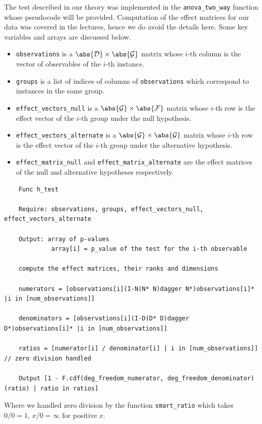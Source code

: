 \documentclass{article}
\begin{document}
The test described in our theory was implemented in the \texttt{anova\_two\_way} function whose pseudocode will be provided. Computation of the effect matrices for our data was covered in the lectures, hence we do avoid the details here. Some key variables and arrays are discussed below.
\begin{itemize}
    \item \texttt{observations} is a $\abs{\mathcal{D}} \times \abs{\mathcal{G}}$ matrix whose $i$-th column is the vector of observables of the $i$-th instance.
    \item \texttt{groups} is a list of indices of columns of \texttt{observations} which correspond to instances in the same group.
    \item \texttt{effect\_vectors\_null} is a $\abs{\mathcal{G}} \times \abs{\mathcal{F}}$ matrix whose $i$-th row is the effect vector of the $i$-th group under the null hypothesis.
    \item \texttt{effect\_vectors\_alternate} is a $\abs{\mathcal{G}} \times \abs{\mathcal{G}}$ matrix whose $i$-th row is the effect vector of the $i$-th group under the alternative hypothesis.
    \item \texttt{effect\_matrix\_null} and \texttt{effect\_matrix\_alternate} are the effect matrices of the null and alternative hypotheses respectively.
\end{itemize}

\begin{verbatim}
    Func h_test

    Require: observations, groups, effect_vectors_null, effect_vectors_alternate

    Output: array of p-values
             array[i] = p_value of the test for the i-th observable

    compute the effect matrices, their ranks and dimensions

    numerators = [observations[i](I-N(N* N)dagger N*)observations[i]* |i in [num_observations]]

    denominators = [observations[i](I-D(D* D)dagger D*)observations[i]* |i in [num_observations]]

    ratios = [numerator[i] / denominator[i] | i in [num_observations]]  // zero division handled

    Output [1 - F.cdf(deg_freedom_numerator, deg_freedom_denominator)(ratio) | ratio in ratios]
\end{verbatim}

Where we handled zero division by the function \texttt{smart\_ratio} which takes $0/0 = 1$, $x/0 = \infty$ for positive $x$.
\end{document}

